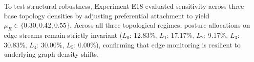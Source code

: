 To test structural robustness, Experiment E18 evaluated sensitivity across three base topology densities by adjusting preferential attachment to yield $\mu_R \in \{0.30, 0.42, 0.55\}$. Across all three topological regimes, posture allocations on edge streams remain strictly invariant ($L_0$: 12.83\%, $L_1$: 17.17\%, $L_2$: 9.17\%, $L_3$: 30.83\%, $L_4$: 30.00\%, $L_5$: 0.00\%), confirming that edge monitoring is resilient to underlying graph density shifts.
